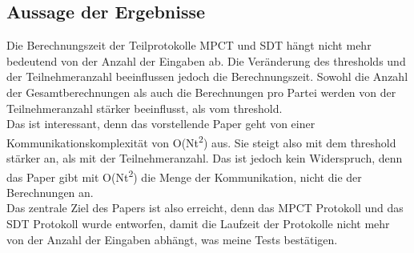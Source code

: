 \subsection{Aussage der Ergebnisse}
Die Berechnungszeit der Teilprotokolle MPCT und SDT hängt nicht mehr bedeutend von der Anzahl der Eingaben ab. Die Veränderung des thresholds und der Teilnehmeranzahl beeinflussen jedoch die Berechnungszeit. Sowohl die Anzahl der Gesamtberechnungen als auch die Berechnungen pro Partei werden von der Teilnehmeranzahl stärker beeinflusst, als vom threshold.\\
Das ist interessant, denn das vorstellende Paper \cite{Doettling2021} geht von einer Kommunikationskomplexität von O(Nt\textsuperscript{2}) aus. Sie steigt also mit dem threshold stärker an, als mit der Teilnehmeranzahl. Das ist jedoch kein Widerspruch, denn das Paper gibt mit O(Nt\textsuperscript{2}) die Menge der Kommunikation, nicht die der Berechnungen an.\\
Das zentrale Ziel des Papers \cite{Doettling2021} ist also erreicht, denn das MPCT Protokoll und das SDT Protokoll wurde entworfen, damit die Laufzeit der Protokolle nicht mehr von der Anzahl der Eingaben abhängt, was meine Tests bestätigen.